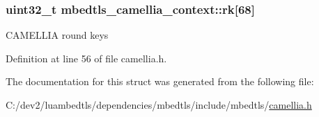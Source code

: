 \hypertarget{structmbedtls__camellia__context_ab5d709c14cdfa36ac163bfd973324f19}{
\subsubsection[{rk}]{\setlength{\rightskip}{0pt plus 5cm}uint32\-\_\-t mbedtls\-\_\-camellia\-\_\-context\-::rk\mbox{[}68\mbox{]}}}\label{structmbedtls__camellia__context_ab5d709c14cdfa36ac163bfd973324f19}
C\-A\-M\-E\-L\-L\-I\-A round keys 

Definition at line 56 of file camellia.\-h.



The documentation for this struct was generated from the following file\-:\begin{DoxyCompactItemize}
\item 
C\-:/dev2/luambedtls/dependencies/mbedtls/include/mbedtls/\hyperlink{camellia_8h}{camellia.\-h}\end{DoxyCompactItemize}
